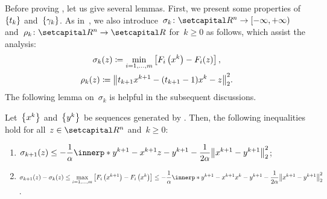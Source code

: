 \documentclass[../main]{subfiles}
\begin{document}
Before proving , let us give several lemmas.
First, we present some properties of~$\set{t_k}$ and~$\set{\gamma_k}$.
As in~\cite{Tanabe2022a}, we also introduce~$\sigma_k \colon \setR^n \to [-\infty, +\infty)$ and~$\rho_k \colon \setR^n \to \setR$ for~$k \ge 0$ as follows, which assist the analysis:
\begin{equation} \label{eq:sigma rho}
    \begin{gathered}
        \sigma_k(z) \coloneqq \min_{i = 1, \dots, m} \left[ F_i\left(x^k\right) - F_i(z) \right], \\
        \rho_k(z) \coloneqq \norm*{t_{k + 1} x^{k + 1} - (t_{k + 1} - 1) x^k - z}_2^2
        .\end{gathered}
\end{equation}
The following lemma on~$\sigma_k$ is helpful in the subsequent discussions.
\begin{lemma} 
    Let~$\set*{x^k}$ and~$\set*{y^k}$ be sequences generated by .
    Then, the following inequalities hold for all~$z \in \setR^n$ and~$k \ge 0$:
    \begin{enumerate}
        \item {} $\displaystyle \sigma_{k + 1}(z) \le - \frac{1}{\alpha} \innerp*{y^{k + 1} - x^{k + 1}}{z - y^{k + 1}} - \frac{1}{2 \alpha} \norm*{x^{k + 1} - y^{k + 1}}_2^2$;
        \item {} $\displaystyle \sigma_{k + 1}(z) - \sigma_k(z) \le \max_{i = 1, \dots, m} \left[ F_i\left(x^{k + 1}\right) - F_i\left( x^k \right) \right] \le - \frac{1}{\alpha} \innerp*{y^{k + 1} - x^{k + 1}}{x^k - y^{k + 1}} - \frac{1}{2 \alpha} \norm*{x^{k + 1} - y^{k + 1}}_2^2$.
    \end{enumerate}
\end{lemma}
\end{document}
